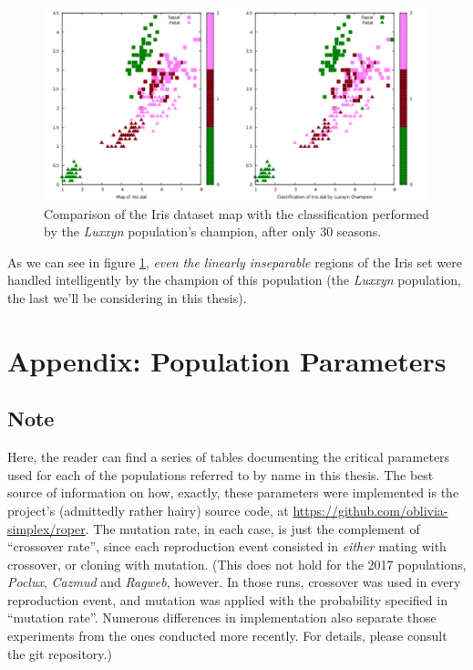 \documentclass[12pt,glossary]{dalthesis}
\begin{document}
\begin{figure}[htbp]
\centering
\includegraphics[width=.9\linewidth]{../images/plots/iris_with_luxxyn.pdf}
\caption{\label{fig:org45c25a5}
Comparison of the Iris dataset map with the classification performed by the \emph{Luxxyn} population's champion, after only 30 seasons.}
\end{figure}

As we can see in figure \ref{fig:org45c25a5}, \emph{even the linearly inseparable} 
regions of the Iris set were handled intelligently by the champion of this population
(the \emph{Luxxyn} population, the last we'll be considering in this thesis). 



\chapter{Appendix: Population Parameters}
\label{sec:orgc3373f2}

\section{Note}
\label{sec:orga67fedc}
Here, the reader can find a series of tables documenting the critical parameters
used for each of the populations referred to by name in this thesis. The best source of
information on how, exactly, these parameters were implemented is the project's
(admittedly rather hairy) source code, at
\url{https://github.com/oblivia-simplex/roper}. The mutation rate, in each case,
is just the complement of ``crossover rate'', since each reproduction event
consisted in \emph{either} mating with crossover, or cloning with mutation. (This
does not hold for the 2017 populations, \emph{Poclux}, \emph{Cazmud} and \emph{Ragweb},
however. In those runs, crossover was used in every reproduction event, and
mutation was applied with the probability specified in ``mutation rate''. Numerous
differences in implementation also separate those experiments from the ones
conducted more recently. For details, please consult the git repository.)
\end{document}
